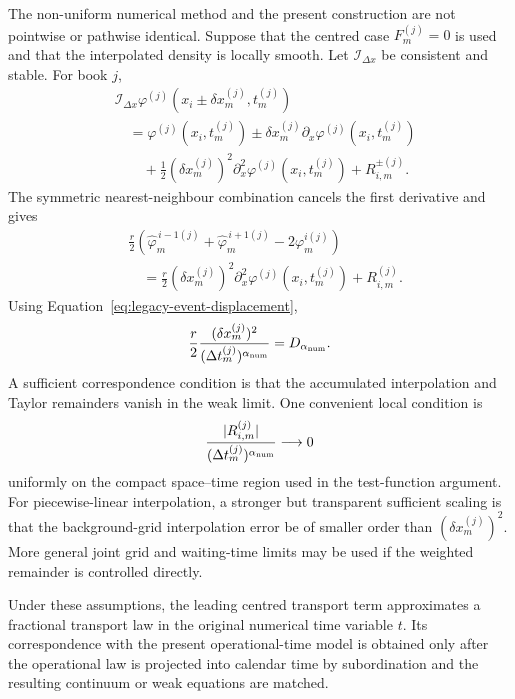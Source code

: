 \documentclass[5p,final]{elsarticle}
\begin{document}
The non-uniform numerical method and the present construction are not pointwise or pathwise identical. Suppose that the centred case $F_m^{(j)}=0$ is used and that the interpolated density is locally smooth. Let $\mathcal I_{\Delta x}$ be consistent and stable. For book $j$,
\begin{equation}
\begin{aligned}
&\mathcal I_{\Delta x}\varphi^{(j)}
\left(x_i\pm\delta x_m^{(j)},t_m^{(j)}\right)\\
&\quad=\varphi^{(j)}\left(x_i,t_m^{(j)}\right)
\pm\delta x_m^{(j)}\partial_x\varphi^{(j)}
\left(x_i,t_m^{(j)}\right)\\
&\qquad+\tfrac{1}{2}(\delta x_m^{(j)})^2
\partial_x^2\varphi^{(j)}\left(x_i,t_m^{(j)}\right)
+R_{i,m}^{\pm(j)}.
\end{aligned}
\end{equation}
The symmetric nearest-neighbour combination cancels the first derivative and gives
\begin{equation}
\begin{aligned}
&\frac{r}{2}\left(
\widehat\varphi_m^{\,i-1(j)}
+\widehat\varphi_m^{\,i+1(j)}
-2\varphi_m^{i(j)}\right)\\
&\quad=\frac{r}{2}(\delta x_m^{(j)})^2
\partial_x^2\varphi^{(j)}\left(x_i,t_m^{(j)}\right)
+R_{i,m}^{(j)}.
\end{aligned}
\end{equation}
Using Equation~\eqref{eq:legacy-event-displacement},
\begin{equation}
    \frac{r}{2}\frac{(\delta x_m^{(j)})^2}
    {(\Delta t_m^{(j)})^{\alpha_{\rm num}}}
    =D_{\alpha_{\rm num}}.
\end{equation}
A sufficient correspondence condition is that the accumulated interpolation and Taylor remainders vanish in the weak limit. One convenient local condition is
\begin{equation}
    \frac{|R_{i,m}^{(j)}|}
    {(\Delta t_m^{(j)})^{\alpha_{\rm num}}}
    \longrightarrow0
\end{equation}
uniformly on the compact space--time region used in the test-function argument. For piecewise-linear interpolation, a stronger but transparent sufficient scaling is that the background-grid interpolation error be of smaller order than $(\delta x_m^{(j)})^2$. More general joint grid and waiting-time limits may be used if the weighted remainder is controlled directly.

Under these assumptions, the leading centred transport term approximates a fractional transport law in the original numerical time variable $t$. Its correspondence with the present operational-time model is obtained only after the operational law is projected into calendar time by subordination and the resulting continuum or weak equations are matched.
\end{document}
